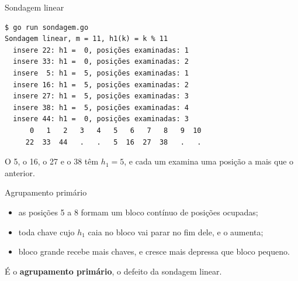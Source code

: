 \documentclass{beamer}
\begin{document}
\begin{frame}[fragile]{Sondagem linear}
	\begin{verbatim}
$ go run sondagem.go
Sondagem linear, m = 11, h1(k) = k % 11
  insere 22: h1 =  0, posições examinadas: 1
  insere 33: h1 =  0, posições examinadas: 2
  insere  5: h1 =  5, posições examinadas: 1
  insere 16: h1 =  5, posições examinadas: 2
  insere 27: h1 =  5, posições examinadas: 3
  insere 38: h1 =  5, posições examinadas: 4
  insere 44: h1 =  0, posições examinadas: 3
      0   1   2   3   4   5   6   7   8   9  10
     22  33  44   .   .   5  16  27  38   .   .
\end{verbatim}

	\vspace{0.1cm}
	\small
	O 5, o 16, o 27 e o 38 têm $h_1 = 5$, e cada um examina uma posição a mais
	que o anterior.
\end{frame}

\begin{frame}{Agrupamento primário}
	\begin{center}
	\end{center}

	\vspace{0.3cm}
	\begin{itemize}
		\item as posições 5 a 8 formam um bloco contínuo de posições ocupadas;
		\item toda chave cujo $h_1$ caia no bloco vai parar no fim dele, e o
		      aumenta;
		\item bloco grande recebe mais chaves, e cresce mais depressa que bloco
		      pequeno.
	\end{itemize}

	\vspace{0.3cm}
	É o \textbf{agrupamento primário}, o defeito da sondagem linear.
\end{frame}
\end{document}
